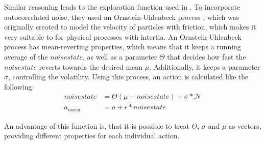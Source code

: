 Similar reasoning leads to the exploration function used in \cite{lillicrap_continuous_2015}. To incorporate autocorrelated noise, they used an Ornstein-Uhlenbeck process \cite{uhlenbeck_theory_1930}, which was originally created to model the velocity of particles with friction, which makes it very suitable to for physical processes with intertia. An Ornstein-Uhlenbeck process has mean-reverting properties, which means that it keeps a running average of the $noisestate$, as well as a parameter $\Theta$ that decides how fast the $noisestate$ reverts towards the desired mean $\mu$. Additionally, it keeps a parameter $\sigma$, controlling the volatility. Using this process, an action is calculated like the following:
\begin{align*}
	noisestate &= \Theta (\mu - noisestate) + \sigma * \mathcal{N}\\
	a_{noisy}  &= a + \epsilon * noisestate
\end{align*}

An advantage of this function is, that it is possible to treat $\Theta$, $\sigma$ and $\mu$ as vectors, providing different properties for each individual action.
 
 
